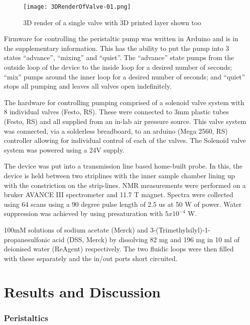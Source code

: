 \begin{figure}
  \begin{center}
  \texttt{[image: 3DRenderOfValve-01.png]}
  \caption{3D render of a single valve with 3D printed layer shown too}
  \label{fig:ValveRend}
  \end{center}
\end{figure}

Firmware for controlling the peristaltic pump was written in Arduino and is in the
supplementary information. This has the ability to put the pump into 3 states
“advance”, “mixing” and “quiet”. The “advance” state pumps from the outside loop of
the device to the inside loop for a desired number of seconds; “mix” pumps around the
inner loop for a desired number of seconds; and “quiet” stops all pumping and leaves
all valves open indefinitely.

The hardware for controlling pumping comprised of a solenoid valve system with 8
individual valves (Festo, RS). These were connected to 3mm plastic tubes (Festo, RS)
and all supplied from an in-lab air pressure source. This valve system was connected,
via a solderless breadboard, to an arduino (Mega 2560, RS) controller allowing for
individual control of each of the valves. The Solenoid valve system was powered using
a 24V supply.

The device was put into a transmission line based home-built probe. In this, the
device is held between two striplines with the inner sample chamber lining up with the
constriction on the strip-lines. NMR measurements were performed on a bruker AVANCE
III spectrometer and 11.7 T magnet. Spectra were collected using 64 scans using a 90
degree pulse length of 2.5 us at 50 W of power. Water suppression was achieved by
using presaturation with $5x10^{-4}$ W.

100mM solutions of sodium acetate (Merck) and 3-(Trimethylsilyl)-1-propanesulfonic
acid (DSS, Merck) by dissolving 82 mg and 196 mg in 10 ml of deionised water
(ReAgent)
respectively. The two fluidic loops were then filled with these separately and the
in/out ports short circuited.

\section{Results and Discussion}

\subsubsection{Peristaltics}

